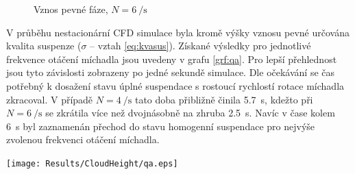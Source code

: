 \begin{figure}[h!]
 \centering
  \qquad 
  \caption{Vznos pevné fáze, $N=\SI{6}{\per\second}$}
  \label{fig:h-w10-6s}
\end{figure}
\newpage

V průběhu nestacionární CFD simulace byla kromě výšky vznosu pevné určována kvalita suspenze ($\sigma$ -- vztah \ref{eq:kvasus}). Získané výsledky pro jednotlivé frekvence otáčení míchadla jsou uvedeny v grafu \ref{grf:qa}. Pro lepší přehlednost jsou tyto závislosti zobrazeny po jedné sekundě simulace. Dle očekávání se čas potřebný k dosažení stavu úplné suspendace s rostoucí rychlostí rotace míchadla zkracoval. V případě $N=\SI{4}{\per\second}$ tato doba přibližně činila \SI{5.7}{\second}, kdežto při $N=\SI{6}{\per\second}$ se zkrátila více než dvojnásobně na zhruba \SI{2.5}{\second}. Navíc v čase kolem \SI{6}{\second} byl zaznamenán přechod do stavu homogenní suspendace pro nejvýše zvolenou frekvenci otáčení míchadla. 

\begin{grf}[h!]
 \centering
  \texttt{[image: Results/CloudHeight/qa.eps]}
  \caption{Průběh kvality suspenze}
  \label{grf:qa}
\end{grf}

